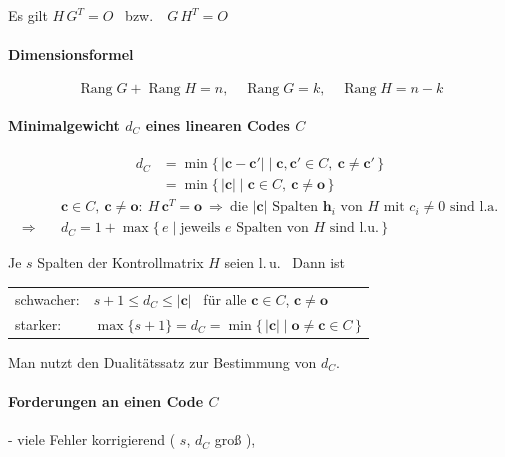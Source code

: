 Es gilt \qquad $H\,G^T = O$ \ bzw.\ \ $G\,H^T = O$

\paragraph{Dimensionsformel}
\[ \operatorname{Rang} G + \operatorname{Rang} H = n, \quad \operatorname{Rang} G = k, \quad \operatorname{Rang} H = n - k \]

\paragraph{Minimalgewicht $d_C$ eines linearen Codes $C$}
\begin{align*}
d_C &= \min\{\, |\mathbf{c} - \mathbf{c}'| \mid \mathbf{c}, \mathbf{c}' \in C,\ \mathbf{c} \neq \mathbf{c}' \,\} \\
&= \min\{\, |\mathbf{c}| \mid \mathbf{c} \in C,\ \mathbf{c} \neq \mathbf{o} \,\}
\end{align*}
\begin{align*}
& \mathbf{c} \in C,\ \mathbf{c} \neq \mathbf{o}:\ H\,\mathbf{c}^T = \mathbf{o} \ \Rightarrow \ \text{die } |\mathbf{c}| \text{ Spalten } \mathbf{h}_i \text{ von } H \text{ mit } c_i \neq 0 \text{ sind l.a.} \\
\Rightarrow\quad & d_C = 1 + \max\{\, e \mid \text{jeweils } e \text{ Spalten von } H \text{ sind l.u.} \,\}
\end{align*}

\begin{satz}[Dualitätssatz]
Je $s$ Spalten der Kontrollmatrix $H$ seien l.\,u. \ Dann ist\\
\begin{tabular}{ll}
schwacher: & $s + 1 \leq d_C \leq |\mathbf{c}|$ \ für alle $\mathbf{c} \in C$, $\mathbf{c} \neq \mathbf{o}$ \\
starker: & $\max\{s + 1\} = d_C = \min\{\, |\mathbf{c}| \mid \mathbf{o} \neq \mathbf{c} \in C \,\}$ \\
\end{tabular}
\end{satz}

Man nutzt den Dualitätssatz zur Bestimmung von $d_C$.

\paragraph{Forderungen an einen Code $C$}
- viele Fehler korrigierend ( $s$, $d_C$ groß ),

